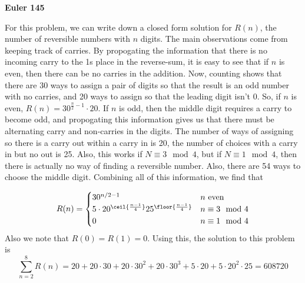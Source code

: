 \documentclass{article}
\begin{document}
\centerline{\textbf{Euler 145}}

For this problem, we can write down a closed form solution for $R(n)$, the number of reversible numbers with $n$ digits. The main observations come from keeping track of carries. By propogating the information that there is no incoming carry to the 1s place in the reverse-sum, it is easy to see that if $n$ is even, then there can be no carries in the addition. Now, counting shows that there are 30 ways to assign a pair of digits so that the result is an odd number with no carries, and 20 ways to assign so that the leading digit isn't 0. So, if $n$ is even, $R(n) = 30^{\frac{n}2 - 1}\cdot20$. If $n$ is odd, then the middle digit requires a carry to become odd, and propogating this information gives us that there must be alternating carry and non-carries in the digits. The number of ways of assigning so there is a carry out within a carry in is 20, the number of choices with a carry in but no out is 25. Also, this works if $N \equiv 3 \mod 4$, but if $N \equiv 1 \mod 4$, then there is actually no way of finding a reversible number. Also, there are 54 ways to choose the middle digit. Combining all of this information, we find that

\[R(n) = \begin{cases}
  30^{n/2 - 1} & n \text{ even}\\
  5\cdot20^{\ceil{\frac{n-1}4}}25^{\floor{\frac{n-1}4}} & n\equiv 3 \mod 4\\
  0 & n\equiv 1 \mod 4
  \end{cases}
\]
Also we note that $R(0) = R(1) = 0$. Using this, the solution to this problem is
\[\sum_{n=2}^8 R(n) = 20 + 20\cdot30 + 20\cdot30^2 + 20\cdot30^3 + 5\cdot20 + 5\cdot20^2\cdot25 = 608720\]
\end{document}
